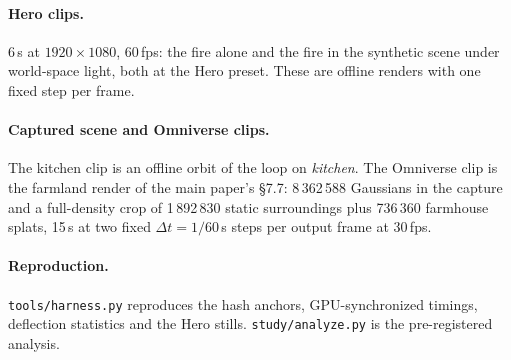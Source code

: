 \documentclass[acmtog,nonacm]{acmart}
\begin{document}
\paragraph{Hero clips.} 6\,s at $1920\times1080$, 60\,fps: the fire alone and the fire in the synthetic scene under world-space light, both at the Hero preset. These are offline renders with one fixed step per frame.

\paragraph{Captured scene and Omniverse clips.} The kitchen clip is an offline orbit of the loop on \emph{kitchen}. The Omniverse clip is the farmland render of the main paper's \S7.7: 8\,362\,588 Gaussians in the capture and a full-density crop of 1\,892\,830 static surroundings plus 736\,360 farmhouse splats, 15\,s at two fixed $\Delta t=1/60$\,s steps per output frame at 30\,fps.

\paragraph{Reproduction.} \texttt{tools/harness.py} reproduces the hash anchors, GPU-synchronized timings, deflection statistics and the Hero stills. \texttt{study/analyze.py} is the pre-registered analysis.



\end{document}
